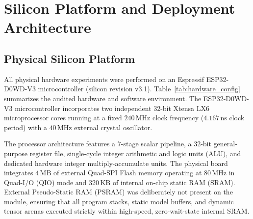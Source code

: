 \documentclass[journal,10pt]{IEEEtran}
\begin{document}
\section{Silicon Platform and Deployment Architecture}

\subsection{Physical Silicon Platform}
All physical hardware experiments were performed on an Espressif ESP32-D0WD-V3 microcontroller (silicon revision v3.1). Table~\ref{tab:hardware_config} summarizes the audited hardware and software environment. The ESP32-D0WD-V3 microcontroller incorporates two independent 32-bit Xtensa LX6 microprocessor cores running at a fixed $240\,\text{MHz}$ clock frequency ($4.167\,\text{ns}$ clock period) with a $40\,\text{MHz}$ external crystal oscillator. 

The processor architecture features a 7-stage scalar pipeline, a 32-bit general-purpose register file, single-cycle integer arithmetic and logic units (ALU), and dedicated hardware integer multiply-accumulate units. The physical board integrates $4\,\text{MB}$ of external Quad-SPI Flash memory operating at $80\,\text{MHz}$ in Quad-I/O (QIO) mode and $320\,\text{KB}$ of internal on-chip static RAM (SRAM). External Pseudo-Static RAM (PSRAM) was deliberately not present on the module, ensuring that all program stacks, static model buffers, and dynamic tensor arenas executed strictly within high-speed, zero-wait-state internal SRAM.

\begin{table}[t]
\centering
\footnotesize
\renewcommand{\arraystretch}{0.92}
\caption{Audited Hardware and Software Deployment Configuration}
\label{tab:hardware_config}
\end{table}
\end{document}
